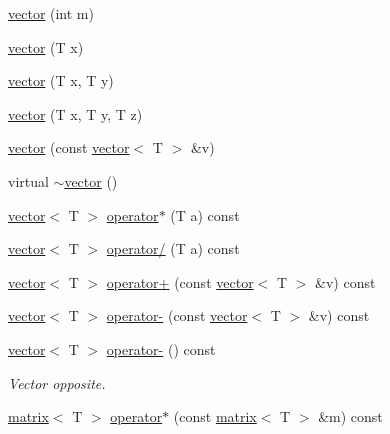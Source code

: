 \begin{DoxyCompactItemize}
\item 
\hyperlink{classlibNumerics_1_1vector_a0b6ba62d806153883bff6d9bb434a098}{vector} (int m)
\item 
\hyperlink{classlibNumerics_1_1vector_a3ea5ce3593cbdfdde40c27170df29223}{vector} (T x)
\item 
\hyperlink{classlibNumerics_1_1vector_a4c6210dd9967dfcd0054d438ae48832a}{vector} (T x, T y)
\item 
\hyperlink{classlibNumerics_1_1vector_ad54b95d1ec6ff9a9681821525478e660}{vector} (T x, T y, T z)
\item 
\hyperlink{classlibNumerics_1_1vector_a78fe70d80e248e4b245387d89ad4db20}{vector} (const \hyperlink{classlibNumerics_1_1vector}{vector}$<$ T $>$ \&v)
\item 
virtual \hyperlink{classlibNumerics_1_1vector_ae914f347affffad704952b4c8d191b5f}{$\sim$vector} ()
\item 
\hyperlink{classlibNumerics_1_1vector}{vector}$<$ T $>$ \hyperlink{classlibNumerics_1_1vector_a3960f8c9e0c215db5f9b7b3b5423945d}{operator$\ast$} (T a) const 
\item 
\hyperlink{classlibNumerics_1_1vector}{vector}$<$ T $>$ \hyperlink{classlibNumerics_1_1vector_a65f2ac0efc9cddc43a47a4dbc9290ea4}{operator/} (T a) const 
\item 
\hyperlink{classlibNumerics_1_1vector}{vector}$<$ T $>$ \hyperlink{classlibNumerics_1_1vector_a4b6cdff2aa8053a39fa2156c9f86a269}{operator+} (const \hyperlink{classlibNumerics_1_1vector}{vector}$<$ T $>$ \&v) const 
\item 
\hyperlink{classlibNumerics_1_1vector}{vector}$<$ T $>$ \hyperlink{classlibNumerics_1_1vector_a556b807143135fef01bc0a2487f7fe3d}{operator-\/} (const \hyperlink{classlibNumerics_1_1vector}{vector}$<$ T $>$ \&v) const 
\item 
\hyperlink{classlibNumerics_1_1vector}{vector}$<$ T $>$ \hyperlink{classlibNumerics_1_1vector_a029117a6c2e3c205a1920c11c19a726a}{operator-\/} () const 
\begin{DoxyCompactList}\small\item\em Vector opposite. \end{DoxyCompactList}\item 
\hyperlink{classlibNumerics_1_1matrix}{matrix}$<$ T $>$ \hyperlink{classlibNumerics_1_1vector_ad1d6be8469b8f5051565e6deb88a270a}{operator$\ast$} (const \hyperlink{classlibNumerics_1_1matrix}{matrix}$<$ T $>$ \&m) const 
\item 

\end{DoxyCompactItemize}
